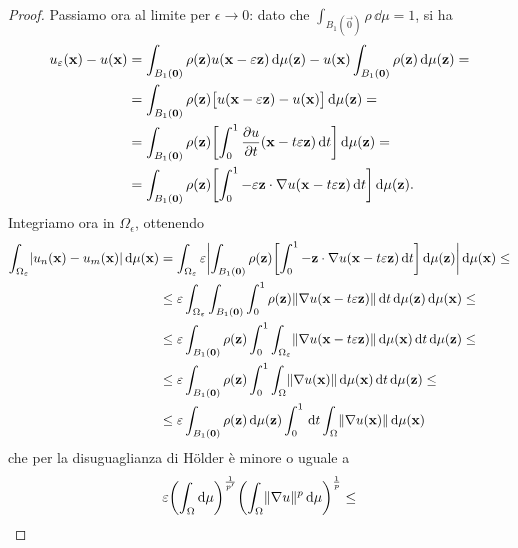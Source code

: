 \begin{proof}
    Passiamo ora al limite per $\epsilon\to 0$: dato che $\int_{B_1(\vec 0)}\rho\,\dd\mu=1$, si ha
    \begin{equation}
        \begin{split}
            u_\epsilon(\vec x)-u(\vec x)&=
            \int_{B_1(\vec 0)}\rho(\vec z)u(\vec x-\epsilon\vec z)\,\dd\mu(\vec z)-u(\vec x)\int_{B_1(\vec 0)}\rho(\vec z)\,\dd\mu(\vec z)=\\ &=
            \int_{B_1(\vec 0)}\rho(\vec z)\bigl[u(\vec x-\epsilon\vec z)-u(\vec x)\bigr]\,\dd\mu(\vec z)=\\ &=
            \int_{B_1(\vec 0)}\rho(\vec z)\biggl[\int_0^1\drp{u}{t}(\vec x-t\epsilon\vec z)\,\dd t\biggr]\,\dd\mu(\vec z)=\\ &=
            \int_{B_1(\vec 0)}\rho(\vec z)\biggl[\int_0^1-\epsilon\scalar{\vec z}{\grad u(\vec x-t\epsilon\vec z)}\,\dd t\biggr]\,\dd\mu(\vec z).
        \end{split}
    \end{equation}
    Integriamo ora in $\Omega_\epsilon$, ottenendo
    \begin{equation}
        \begin{split}
            \int_{\Omega_\epsilon}\abs{u_n(\vec x)-u_m(\vec x)}\,\dd\mu(\vec x)&=
            \int_{\Omega_\epsilon}\epsilon\abs[\bigg]{\int_{B_1(\vec 0)}\rho(\vec z)\biggl[\int_0^1-\scalar{\vec z}{\grad u(\vec x-t\epsilon\vec z)}\,\dd t\biggr]\,\dd\mu(\vec z)}\,\dd\mu(\vec x)\le\\ &\le
            \epsilon\int_{\Omega_\epsilon}\int_{B_1(\vec 0)}\int_0^1\rho(\vec z)\norm{\grad u(\vec x-t\epsilon\vec z)}\,\dd t\,\dd\mu(\vec z)\,\dd\mu(\vec x)\le\\ &\le
            \epsilon\int_{B_1(\vec 0)}\rho(\vec z)\int_0^1\int_{\Omega_\epsilon}\norm{\grad u(\vec x-t\epsilon\vec z)}\,\dd\mu(\vec x)\,\dd t\,\dd\mu(\vec z)\le\\ &\le
            \epsilon\int_{B_1(\vec 0)}\rho(\vec z)\int_0^1\int_\Omega\norm{\grad u(\vec x)}\,\dd\mu(\vec x)\,\dd t\,\dd\mu(\vec z)\le\\ &\le
            \epsilon\int_{B_1(\vec 0)}\rho(\vec z)\,\dd\mu(\vec z)\int_0^1\,\dd t\int_\Omega\norm{\grad u(\vec x)}\,\dd\mu(\vec x)
        \end{split}
    \end{equation}
    che per la disuguaglianza di Hölder è minore o uguale a
    \begin{equation}
        \epsilon\biggl(\int_\Omega\dd\mu\biggr)^\frac1{p'}\biggl(\int_\Omega\norm{\grad u}^p\,\dd\mu\biggr)^\frac1{p}\le

\end{equation}
\end{proof}

